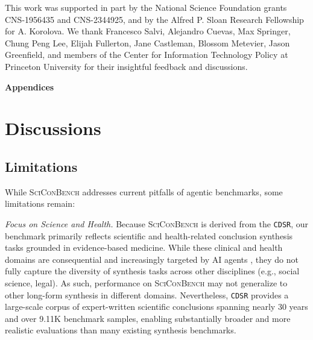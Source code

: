 \documentclass{article}
\begin{document}
\begin{ack}
This work was supported in part by the National Science Foundation grants CNS-1956435 and CNS-2344925, and by the Alfred P. Sloan Research Fellowship for A. Korolova. We thank Francesco Salvi, Alejandro Cuevas, Max Springer, Chung Peng Lee, Elijah Fullerton, Jane Castleman, Blossom Metevier, Jason Greenfield, and members of the Center for Information Technology Policy at Princeton University for their insightful feedback and discussions.
\end{ack}





\newpage
\appendix
\startcontents[appendix]



{\LARGE\bfseries Appendices\par}
\vspace{0.7cm}

\newpage



\renewcommand{\thetable}{S\arabic{table}}
\renewcommand{\thefigure}{S\arabic{figure}}


\section{Discussions}\label{appendix:discussion}


\subsection{Limitations}

While \textsc{SciConBench} addresses current pitfalls of agentic benchmarks, some limitations remain: 

\textit{Focus on Science and Health.} Because \textsc{SciConBench} is derived from the \texttt{CDSR}, our benchmark primarily reflects scientific and health-related conclusion synthesis tasks grounded in evidence-based medicine. While these clinical and health domains are consequential and increasingly targeted by AI agents \cite{nytimes_google_ai_health_2024, openevidence2026million}, they do not fully capture the diversity of synthesis tasks across other disciplines (e.g., social science, legal). As such, performance on \textsc{SciConBench} may not generalize to other long-form synthesis in different domains. Nevertheless, \texttt{CDSR} provides a large-scale corpus of expert-written scientific conclusions spanning nearly 30 years and over 9.11K benchmark samples, enabling substantially broader and more realistic evaluations than many existing synthesis benchmarks.
\end{document}
